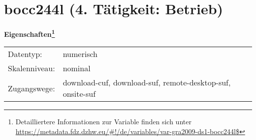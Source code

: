 
    \setcounter{footnote}{0}

    \vspace*{-1.8cm}
	\section{bocc244l (4. Tätigkeit: Betrieb)}
	\label{section:bocc244l}



    \vspace*{0.5cm}
    \noindent\textbf{Eigenschaften\footnote{Detailliertere Informationen zur Variable finden sich unter
		\url{https://metadata.fdz.dzhw.eu/\#!/de/variables/var-gra2009-ds1-bocc244l$}}}\\
	\begin{tabularx}{\hsize}{@{}lX}
	Datentyp: & numerisch \\
	Skalenniveau: & nominal \\
	Zugangswege: &
	  download-cuf, 
	  download-suf, 
	  remote-desktop-suf, 
	  onsite-suf
 \\
    \end{tabularx}




